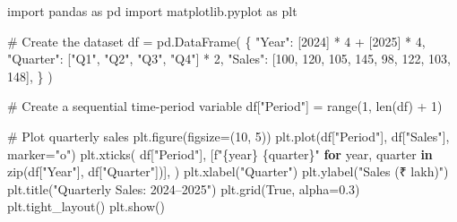 \documentclass[
  a4paper,
]{article}
\newenvironment{Shaded}{\begin{snugshade}}{\end{snugshade}}
\newcommand{\BuiltInTok}[1]{\textcolor[rgb]{0.00,0.23,0.31}{#1}}
\newcommand{\CommentTok}[1]{\textcolor[rgb]{0.37,0.37,0.37}{#1}}
\newcommand{\ControlFlowTok}[1]{\textcolor[rgb]{0.00,0.23,0.31}{\textbf{#1}}}
\newcommand{\DecValTok}[1]{\textcolor[rgb]{0.68,0.00,0.00}{#1}}
\newcommand{\FloatTok}[1]{\textcolor[rgb]{0.68,0.00,0.00}{#1}}
\newcommand{\ImportTok}[1]{\textcolor[rgb]{0.00,0.46,0.62}{#1}}
\newcommand{\KeywordTok}[1]{\textcolor[rgb]{0.00,0.23,0.31}{\textbf{#1}}}
\newcommand{\NormalTok}[1]{\textcolor[rgb]{0.00,0.23,0.31}{#1}}
\newcommand{\OperatorTok}[1]{\textcolor[rgb]{0.37,0.37,0.37}{#1}}
\newcommand{\SpecialCharTok}[1]{\textcolor[rgb]{0.37,0.37,0.37}{#1}}
\newcommand{\SpecialStringTok}[1]{\textcolor[rgb]{0.13,0.47,0.30}{#1}}
\newcommand{\StringTok}[1]{\textcolor[rgb]{0.13,0.47,0.30}{#1}}
\newcommand{\VariableTok}[1]{\textcolor[rgb]{0.07,0.07,0.07}{#1}}
\begin{document}
\begin{tcolorbox}[enhanced jigsaw, arc=.35mm, bottomrule=.15mm, bottomtitle=1mm, breakable, colback=white, colbacktitle=quarto-callout-tip-color!10!white, colframe=quarto-callout-tip-color-frame, coltitle=black, left=2mm, leftrule=.75mm, opacityback=0, opacitybacktitle=0.6, rightrule=.15mm, title=\textcolor{quarto-callout-tip-color}{\faLightbulb}\hspace{0.5em}{💻 Coding Session}, titlerule=0mm, toprule=.15mm, toptitle=1mm]

\begin{Shaded}
\begin{Highlighting}[]
\ImportTok{import}\NormalTok{ pandas }\ImportTok{as}\NormalTok{ pd}
\ImportTok{import}\NormalTok{ matplotlib.pyplot }\ImportTok{as}\NormalTok{ plt}

\CommentTok{\# Create the dataset}
\NormalTok{df }\OperatorTok{=}\NormalTok{ pd.DataFrame(}
\NormalTok{    \{}
        \StringTok{"Year"}\NormalTok{: [}\DecValTok{2024}\NormalTok{] }\OperatorTok{*} \DecValTok{4} \OperatorTok{+}\NormalTok{ [}\DecValTok{2025}\NormalTok{] }\OperatorTok{*} \DecValTok{4}\NormalTok{,}
        \StringTok{"Quarter"}\NormalTok{: [}\StringTok{"Q1"}\NormalTok{, }\StringTok{"Q2"}\NormalTok{, }\StringTok{"Q3"}\NormalTok{, }\StringTok{"Q4"}\NormalTok{] }\OperatorTok{*} \DecValTok{2}\NormalTok{,}
        \StringTok{"Sales"}\NormalTok{: [}\DecValTok{100}\NormalTok{, }\DecValTok{120}\NormalTok{, }\DecValTok{105}\NormalTok{, }\DecValTok{145}\NormalTok{, }\DecValTok{98}\NormalTok{, }\DecValTok{122}\NormalTok{, }\DecValTok{103}\NormalTok{, }\DecValTok{148}\NormalTok{],}
\NormalTok{    \}}
\NormalTok{)}

\CommentTok{\# Create a sequential time{-}period variable}
\NormalTok{df[}\StringTok{"Period"}\NormalTok{] }\OperatorTok{=} \BuiltInTok{range}\NormalTok{(}\DecValTok{1}\NormalTok{, }\BuiltInTok{len}\NormalTok{(df) }\OperatorTok{+} \DecValTok{1}\NormalTok{)}

\CommentTok{\# Plot quarterly sales}
\NormalTok{plt.figure(figsize}\OperatorTok{=}\NormalTok{(}\DecValTok{10}\NormalTok{, }\DecValTok{5}\NormalTok{))}
\NormalTok{plt.plot(df[}\StringTok{"Period"}\NormalTok{], df[}\StringTok{"Sales"}\NormalTok{], marker}\OperatorTok{=}\StringTok{"o"}\NormalTok{)}
\NormalTok{plt.xticks(}
\NormalTok{    df[}\StringTok{"Period"}\NormalTok{],}
\NormalTok{    [}\SpecialStringTok{f"}\SpecialCharTok{\{}\NormalTok{year}\SpecialCharTok{\}}\SpecialStringTok{ }\SpecialCharTok{\{}\NormalTok{quarter}\SpecialCharTok{\}}\SpecialStringTok{"} \ControlFlowTok{for}\NormalTok{ year, quarter }\KeywordTok{in} \BuiltInTok{zip}\NormalTok{(df[}\StringTok{"Year"}\NormalTok{], df[}\StringTok{"Quarter"}\NormalTok{])],}
\NormalTok{)}
\NormalTok{plt.xlabel(}\StringTok{"Quarter"}\NormalTok{)}
\NormalTok{plt.ylabel(}\StringTok{"Sales (₹ lakh)"}\NormalTok{)}
\NormalTok{plt.title(}\StringTok{"Quarterly Sales: 2024–2025"}\NormalTok{)}
\NormalTok{plt.grid(}\VariableTok{True}\NormalTok{, alpha}\OperatorTok{=}\FloatTok{0.3}\NormalTok{)}
\NormalTok{plt.tight\_layout()}
\NormalTok{plt.show()}
\end{Highlighting}
\end{Shaded}


\end{tcolorbox}
\end{document}
